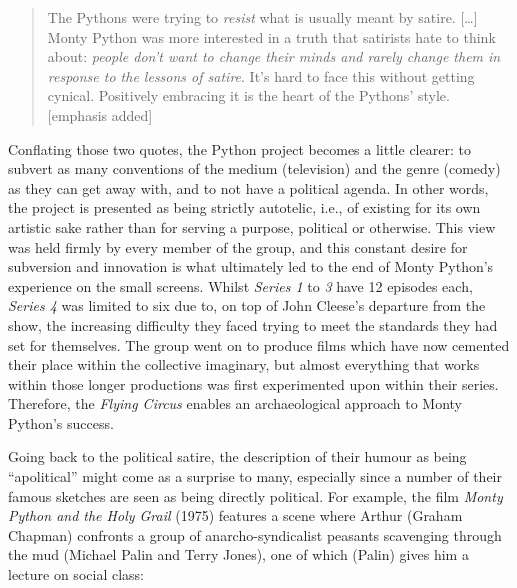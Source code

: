 \documentclass[
,a4paper
,DIV=12
,12pt
,abstract
,bibliography=totoc
]{scrartcl}
\begin{document}
\begin{quote}
  \label{quote-idle-autotelic}
  The Pythons were trying to \emph{resist} what is usually meant by satire.  […] Monty Python was more interested in a truth that satirists hate to think about: \emph{people don’t want to change their minds and rarely change them in response to the lessons of satire}.  It’s hard to face this without getting cynical.  Positively embracing it is the heart of the Pythons’ style. [emphasis added]
\end{quote}
Conflating those two quotes, the Python project becomes a little clearer: to subvert as many conventions of the medium (television) and the genre (comedy) as they can get away with, and to not have a political agenda.  In other words, the project is presented as being strictly autotelic, i.e., of existing for its own artistic sake rather than for serving a purpose, political or otherwise.  This view was held firmly by every member of the group, and this constant desire for subversion and innovation is what ultimately led to the end of Monty Python’s experience on the small screens.  Whilst \emph{Series 1} to \emph{3} have 12 episodes each, \emph{Series 4} was limited to six due to, on top of John Cleese’s departure from the show, the increasing difficulty they faced trying to meet the standards they had set for themselves.  The group went on to produce films which have now cemented their place within the collective imaginary, but almost everything that works within those longer productions was first experimented upon within their series.  Therefore, the \emph{Flying Circus} enables an archaeological approach to Monty Python’s success.

Going back to the political satire, the description of their humour as being \enquote{apolitical} might come as a surprise to many, especially since a number of their famous sketches are seen as being directly political.  For example, the film \emph{Monty Python and the Holy Grail} (1975) features a scene where Arthur (Graham Chapman) confronts a group of anarcho-syndicalist peasants scavenging through the mud (Michael Palin and Terry Jones), one of which (Palin) gives him a lecture on social class:
\end{document}
